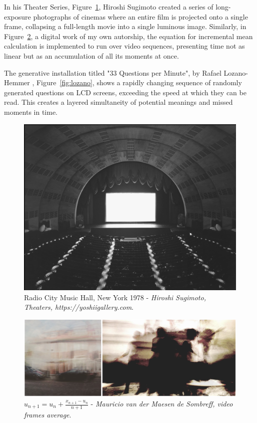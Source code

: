 In his Theater Series, Figure~\ref{fig:sugimoto}, Hiroshi Sugimoto \citep{sugimotohiroshi} created a series of long-exposure photographs of cinemas where an entire film is projected onto a single frame, collapsing a full-length movie into a single luminous image. Similarly, in Figure~\ref{fig:mv01}, a digital work of my own autorship, the equation for incremental mean calculation is implemented to run over video sequences, presenting time not as linear but as an accumulation of all its moments at once.

The generative installation titled "33 Questions per Minute", by Rafael Lozano-Hemmer \citep{lozano-hemmer}, Figure~\ref{fig:lozano}, shows a rapidly changing sequence of randomly generated questions on LCD screens, exceeding the speed at which they can be read. This creates a layered simultaneity of potential meanings and missed moments in time.

\begin{figure}
    \centering
    \includegraphics[width=0.8\linewidth]{assets/hiroshi-sugimoto-theaters-1978-1993-Radio-City-Music-Hall-1.png} 
    \caption{\small  Radio City Music Hall, New York 1978 - \textit{Hiroshi Sugimoto, Theaters, https://yoshiigallery.com}.}
    \label{fig:sugimoto}
\end{figure}


\begin{figure}
    \centering
    \includegraphics[width=0.8\linewidth]{assets/average.png} 
    \caption{\small \( u_{n+1} = u_{n} + \frac{x_{n+1} - u_{n}}{n+1} \) - \textit{Mauricio van der Maesen de Sombreff, video frames average}.}
    \label{fig:mv01}
\end{figure}

